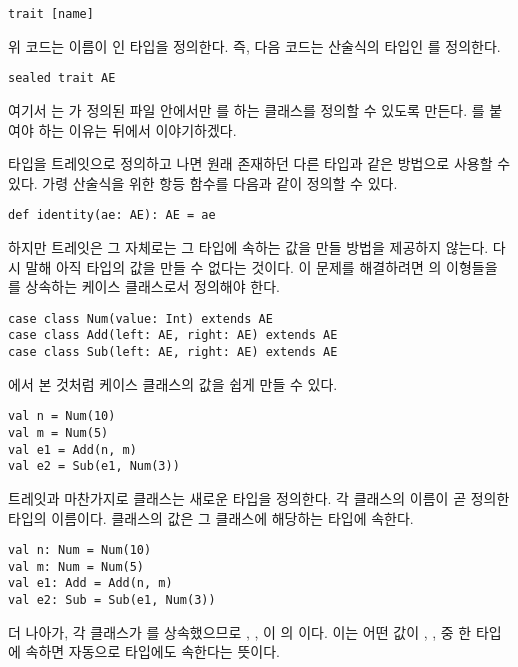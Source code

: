 \begin{verbatim}
trait [name]
\end{verbatim}

위 코드는 이름이 \code{[name]}인 타입을 정의한다. 즉, 다음 코드는 산술식의
타입인 를 정의한다.

\begin{verbatim}
sealed trait AE
\end{verbatim}

여기서 는 가 정의된 파일 안에서만 를
하는 클래스를 정의할 수 있도록 만든다. 를
붙여야 하는 이유는 뒤에서 이야기하겠다.

타입을 트레잇으로 정의하고 나면 원래 존재하던 다른 타입과 같은 방법으로 사용할 수 있다. 가령 산술식을 위한 항등 함수를 다음과 같이 정의할 수 있다.

\begin{verbatim}
def identity(ae: AE): AE = ae
\end{verbatim}

하지만 트레잇은 그 자체로는 그 타입에 속하는 값을 만들 방법을 제공하지 않는다.
다시 말해 아직  타입의 값을 만들 수 없다는 것이다. 이 문제를 해결하려면
의 이형들을 를 상속하는 케이스 클래스로서 정의해야 한다.

\begin{verbatim}
case class Num(value: Int) extends AE
case class Add(left: AE, right: AE) extends AE
case class Sub(left: AE, right: AE) extends AE
\end{verbatim}

에서 본 것처럼 케이스 클래스의 값을 쉽게 만들 수 있다.

\begin{verbatim}
val n = Num(10)
val m = Num(5)
val e1 = Add(n, m)
val e2 = Sub(e1, Num(3))
\end{verbatim}

트레잇과 마찬가지로 클래스는 새로운 타입을 정의한다. 각 클래스의 이름이 곧 정의한 타입의 이름이다. 클래스의 값은 그 클래스에 해당하는 타입에 속한다.

\begin{verbatim}
val n: Num = Num(10)
val m: Num = Num(5)
val e1: Add = Add(n, m)
val e2: Sub = Sub(e1, Num(3))
\end{verbatim}

더 나아가, 각 클래스가 를 상속했으므로 , ,
이 의 이다. 이는 어떤 값이
, ,  중 한 타입에 속하면 자동으로 
타입에도 속한다는 뜻이다.

